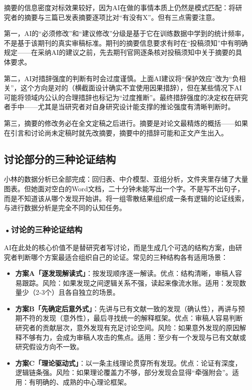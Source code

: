 \begin{critiquebox}
摘要的信息密度对标效果较好，因为AI在做的事情本质上仍然是模式匹配：将研究者的摘要与三篇已发表摘要逐项比对``有没有X''。但有三点需要注意。

第一，AI的``必须修改''和``建议修改''分级是基于它在训练数据中学到的统计频率，不是基于该期刊的真实审稿标准。期刊的摘要信息要求有时在``投稿须知''中有明确规定——在采纳AI的建议之前，先去期刊官网逐条核对投稿须知中关于摘要的具体要求。

第二，AI对措辞强度的判断有时会过度谨慎。上面AI建议将``保护效应''改为``负相关''，这个方向是对的（横截面设计确实不宜使用因果措辞），但在某些情况下AI可能将领域内公认的合理措辞也标记为``过度推断''。最终措辞强度的决定权在研究者手中——尤其是当研究者对自身研究设计能支撑的推论强度有清晰判断时。

第三，摘要的修改务必在全文定稿之后进行。摘要是对论文最精炼的概括——如果在引言和讨论尚未定稿时就先改摘要，摘要中的措辞可能和正文产生出入。
\end{critiquebox}

\subsection{讨论部分的三种论证结构}

小林的数据分析已全部完成：回归表、中介模型、亚组分析，文件夹里存储了大量图表。但她面对空白的Word文档，二十分钟未能写出一个字。不是写不出句子，而是不知道该从哪个发现开始讲。将一组零散结果组织成一条有逻辑的论证线索，与进行数据分析是完全不同的认知任务。

\subsubsection*{\textbf{•讨论的三种论证结构}}AI在此处的核心价值不是替研究者写讨论，而是生成几个可选的结构方案，由研究者判断哪个方案最适合组织自己的论证。常见的三种结构各有适用场景：

\begin{itemize}[nosep]
\item \textbf{方案A「逐发现解读式」}：按发现顺序逐一解读。优点：结构清晰，审稿人容易跟踪。风险：如果发现之间逻辑关系不强，读起来像流水账。适用：发现数量少（2-3个）且各自独立的场景。
\item \textbf{方案B「先确定后意外式」}：先讲与已有文献一致的发现（确认性），再讲与预期不符的发现（意外性），最后寻找统一的解释框架。优点：审稿人容易判断研究者的贡献层次，意外发现有充足讨论空间。风险：如果意外发现的原因解释不够有力，会成为审稿人攻击的焦点。适用：至少有一个发现与已有文献或研究假设方向不一致。
\item \textbf{方案C「理论驱动式」}：以一条主线理论贯穿所有发现。优点：论证有深度，逻辑链条强。风险：如果理论覆盖力不够，部分发现会显得``牵强附会''。适用：有明确的、成熟的中心理论框架。
\end{itemize}


